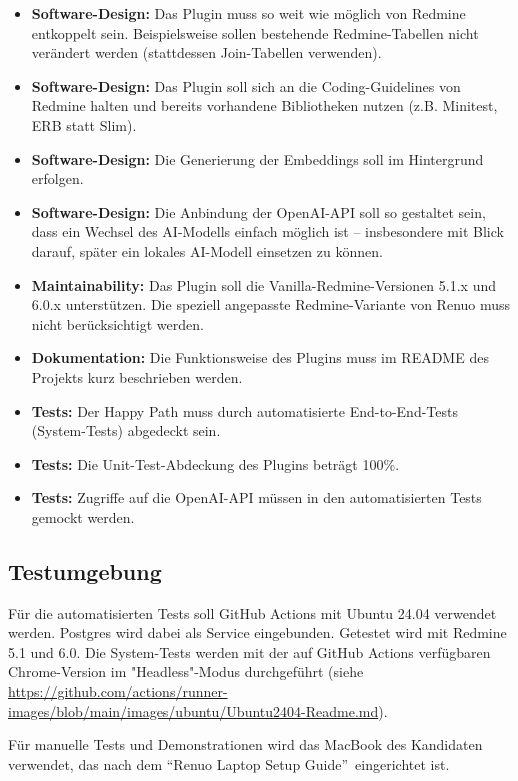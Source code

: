 \begin{itemize}
    \item \textbf{Software-Design:} Das Plugin muss so weit wie möglich von Redmine entkoppelt sein. Beispielsweise sollen bestehende Redmine-Tabellen nicht verändert werden (stattdessen Join-Tabellen verwenden).
    \item \textbf{Software-Design:} Das Plugin soll sich an die Coding-Guidelines von Redmine halten und bereits vorhandene Bibliotheken nutzen (z.B. Minitest, ERB statt Slim).
    \item \textbf{Software-Design:} Die Generierung der Embeddings soll im Hintergrund erfolgen.
    \item \textbf{Software-Design:} Die Anbindung der OpenAI-API soll so gestaltet sein, dass ein Wechsel des AI-Modells einfach möglich ist – insbesondere mit Blick darauf, später ein lokales AI-Modell einsetzen zu können.
    \item \textbf{Maintainability:} Das Plugin soll die Vanilla-Redmine-Versionen 5.1.x und 6.0.x unterstützen. Die speziell angepasste Redmine-Variante von Renuo muss nicht berücksichtigt werden.
    \item \textbf{Dokumentation:} Die Funktionsweise des Plugins muss im README des Projekts kurz beschrieben werden.
    \item \textbf{Tests:} Der Happy Path muss durch automatisierte End-to-End-Tests (System-Tests) abgedeckt sein.
    \item \textbf{Tests:} Die Unit-Test-Abdeckung des Plugins beträgt 100\%.
    \item \textbf{Tests:} Zugriffe auf die OpenAI-API müssen in den automatisierten Tests gemockt werden.
\end{itemize}

\subsection{Testumgebung}

Für die automatisierten Tests soll GitHub Actions mit Ubuntu 24.04 verwendet werden. Postgres wird dabei als Service eingebunden. Getestet wird mit Redmine 5.1 und 6.0. Die System-Tests werden mit der auf GitHub Actions verfügbaren Chrome-Version im "Headless"-Modus durchgeführt (siehe \url{https://github.com/actions/runner-images/blob/main/images/ubuntu/Ubuntu2404-Readme.md}).

Für manuelle Tests und Demonstrationen wird das MacBook des Kandidaten verwendet, das nach dem \textquotedblleft Renuo Laptop Setup Guide\textquotedblright\ eingerichtet ist.

